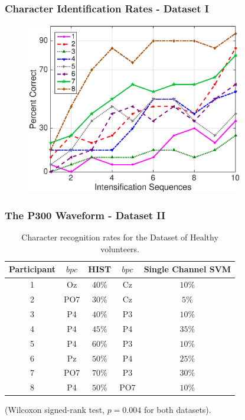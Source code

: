 \documentclass[aspectratio=169]{beamer}
\begin{document}
\begin{frame}
\frametitle{Character Identification Rates - Dataset I}
\begin{center}
\begin{figure}[h!]
\centering
\includegraphics[width=9.5cm]{images/performance.eps}
\label{fig:performance}
\end{figure}
\end{center}
\end{frame} 


\begin{frame}
\frametitle{The P300 Waveform - Dataset II}
\begin{center}
\begin{table}[h!]
\caption{Character recognition rates for the Dataset of Healthy volunteers.}
\centering
\begin{tabular}{c|cc|cc}
\toprule
\textbf{Participant}	&  $bpc$	&  HIST &  $bpc$	&  Single Channel SVM \\
\midrule
1     &     Oz   &   $40\%$  &  Cz   &  $10\%$    \\
2     &     PO7   &   $30\%$      &  Cz   & $5\%$   \\
3     &     P4   &   $40\%$    &  P3   & $10\%$    \\
4     &     P4 &   $45\%$    &  P4   & $35\%$     \\
5     &     P4 &   $60\%$  &  P3   & $10\%$     \\
6     &     Pz &   $50\%$ &  P4   & $25\%$     \\
7     &     PO7 &   $70\%$  &  P3   & $30\%$     \\
8     &     P4 &   $50\%$    &  PO7   & $10\%$    \\

\end{tabular}
\label{tab:resultsown}
\end{table}
(Wilcoxon signed-rank test, $p =  0.004$ for both datasets).
\end{center}
\end{frame} 
\end{document}

